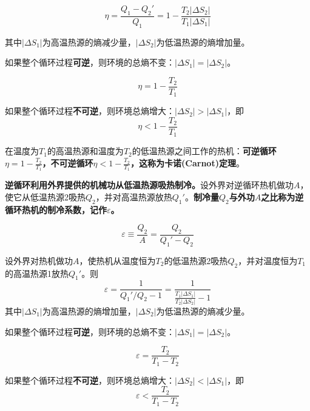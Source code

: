 \documentclass[CJK]{beamer}
\begin{document}
\begin{frame}
\bch
{}
$$\eta = \frac{Q_1-Q_2'}{Q_1} = 1-\frac{T_2|\Delta S_2|}{T_1|\Delta S_1|}$$
{\small 其中$|\Delta S_1|$为高温热源的熵减少量，$|\Delta S_2|$为低温热源的熵增加量。

如果整个循环过程{\bf 可逆}，则环境的总熵不变：$|\Delta S_1| = |\Delta S_2|$。

$$ \eta = 1 - \frac{T_2}{T_1}$$

如果整个循环过程{\bf 不可逆}，则环境总熵增大：$|\Delta S_2| > |\Delta S_1|$，即
$$\eta < 1 - \frac{T_2}{T_1} $$
}
\ech
\end{frame}


\begin{frame}
\bch
{}

在温度为$T_1$的高温热源和温度为$T_2$的低温热源之间工作的热机：{\bf 可逆循环$\eta = 1 -\frac{T_2}{T_1}$，不可逆循环$\eta < 1 - \frac{T_2}{T_1}$，这称为卡诺(Carnot)定理}。
\ech
\end{frame}

\begin{frame}
\bch


{\bf 逆循环利用外界提供的机械功从低温热源吸热制冷。}设外界对逆循环热机做功$A$，使它从低温热源2吸热$Q_2$，并对高温热源放热$Q_1'$。{\bf 制冷量$Q_2$与外功$A$之比称为逆循环热机的制冷系数，记作$\varepsilon$。}

$$\varepsilon \equiv \frac{Q_2}{A}=\frac{Q_2}{Q_1'-Q_2} $$

\ech
\end{frame}


\begin{frame}
\bch
{\small
设外界对热机做功$A$，使热机从温度恒为$T_2$的低温热源2吸热$Q_2$，并对温度恒为$T_1$的高温热源1放热$Q_1'$。则
$$\varepsilon = \frac{1}{Q_1'/Q_2 - 1} = \frac{1}{\frac{T_1|\Delta S_1|}{T_2|\Delta S_2|}-1}$$
其中$|\Delta S_1|$为高温热源的熵增加量，$|\Delta S_2|$为低温热源的熵减少量。

如果整个循环过程{\bf 可逆}，则环境的总熵不变：$|\Delta S_1| = |\Delta S_2|$。

$$ \varepsilon = \frac{T_2}{T_1-T_2}$$

如果整个循环过程{\bf 不可逆}，则环境总熵增大：$|\Delta S_2| < |\Delta S_1|$，即
$$\varepsilon <  \frac{T_2}{T_1-T_2} $$
}
\ech
\end{frame}
\end{document}
